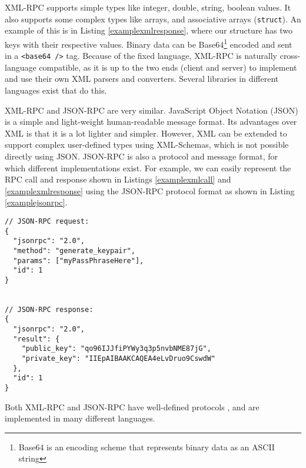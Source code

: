 XML-RPC supports simple types like integer, double, string, boolean values. It also supports some complex types like arrays, and associative arrays (\lstinline{struct}). An example of this is in Listing \ref{examplexmlresponse}, where our structure has two keys with their respective values. Binary data can be Base64\footnote{Base64 is an encoding scheme that represents binary data as an ASCII string} encoded and sent in a \lstinline{<base64 />} tag. Because of the fixed language, XML-RPC is naturally cross-language compatible, as it is up to the two ends (client and server) to implement and use their own XML parsers and converters. Several libraries in different languages exist that do this.

XML-RPC and JSON-RPC are very similar. JavaScript Object Notation (JSON) is a simple and light-weight human-readable message format. Its advantages over XML is that it is a lot lighter and simpler. However, XML can be extended to support complex user-defined types using XML-Schemas, which is not possible directly using JSON. JSON-RPC is also a protocol and message format, for which different implementations exist. For example, we can easily represent the RPC call and response shown in Listings \ref{examplexmlcall} and \ref{examplexmlresponse} using the JSON-RPC protocol format as shown in Listing \ref{examplejsonrpc}.
\\

\begin{lstlisting}
// JSON-RPC request:
{ 
  "jsonrpc": "2.0", 
  "method": "generate_keypair", 
  "params": ["myPassPhraseHere"], 
  "id": 1
}


// JSON-RPC response:
{
  "jsonrpc": "2.0", 
  "result": {
    "public_key": "qo96IJJfiPYWy3q3p5nvbNME87jG",
    "private_key": "IIEpAIBAAKCAQEA4eLvDruo9CswdW"
  }, 
  "id": 1
}

\end{lstlisting}

Both XML-RPC and JSON-RPC have well-defined protocols \cite{jsonrpcspec}\cite{xmlrpcspec}, and are implemented in many different languages.



